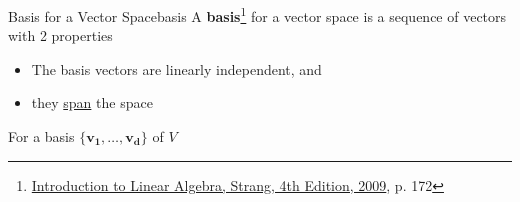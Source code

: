 
\begin{Definition}{Basis for a Vector Space}{basis}
    A \textbf{basis}\footnote{\href{https://trello.com/c/qHJeDNkU}{Introduction to Linear Algebra, Strang, 4th Edition, 2009}, p. 172} for a vector space is a sequence of vectors with 2 properties

    \begin{itemize}
        \item The basis vectors are linearly independent, and
        \item they \hyperlink{column-space}{span} the space
    \end{itemize}
\end{Definition}

For a basis $\{\boldsymbol{v_1}, \ldots, \boldsymbol{v_d}\}$ of $V$

